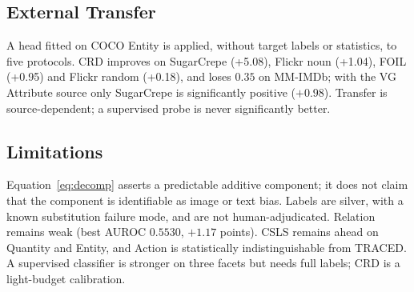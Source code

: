 \subsection{External Transfer}
A head fitted on COCO Entity is applied, without target labels or statistics, to five
protocols. CRD improves on SugarCrepe (+5.08), Flickr noun (+1.04), FOIL (+0.95) and
Flickr random (+0.18), and loses $0.35$ on MM-IMDb; with the VG Attribute source only
SugarCrepe is significantly positive ($+0.98$). Transfer is source-dependent; a
supervised probe is never significantly better.

\subsection{Limitations}
Equation~\eqref{eq:decomp} asserts a predictable additive component; it does not
claim that the component is identifiable as image or text bias. Labels are silver,
with a known substitution failure mode, and are not human-adjudicated. Relation
remains weak (best AUROC $0.5530$, $+1.17$ points). CSLS remains ahead on Quantity
and Entity, and Action is statistically indistinguishable from TRACED. A supervised
classifier is stronger on three facets but needs full labels; CRD is a light-budget
calibration.
